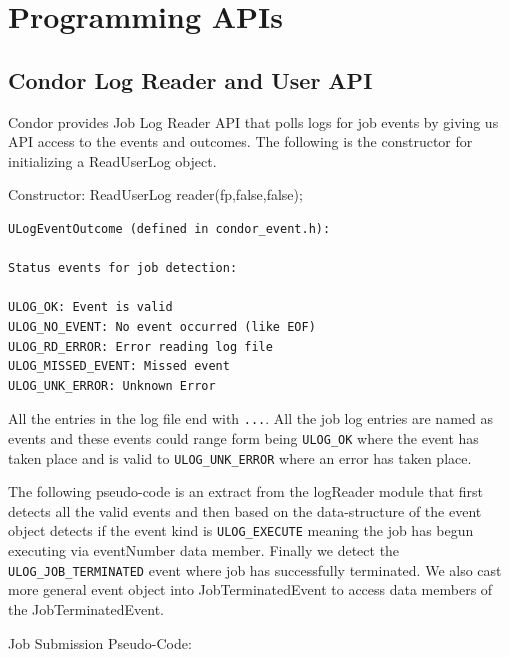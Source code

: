 \documentclass[ms,electronic,double]{nuthesis}
\begin{document}
\section{Programming APIs}
\subsection{Condor Log Reader and User API}

Condor provides Job Log Reader API\cite{manual56} that polls logs for job events by giving us 
API access to the events and outcomes. The following is the constructor for 
initializing a ReadUserLog object.

Constructor:
ReadUserLog reader(fp,false,false);
\begin{verbatim}
ULogEventOutcome (defined in condor_event.h):

Status events for job detection:

ULOG_OK: Event is valid
ULOG_NO_EVENT: No event occurred (like EOF)
ULOG_RD_ERROR: Error reading log file
ULOG_MISSED_EVENT: Missed event
ULOG_UNK_ERROR: Unknown Error
\end{verbatim}

All the entries in the log file end with \texttt{...}. All the job 
log entries are named as events and these events could range form being  \texttt{ULOG\_OK} where 
the event has taken place and is valid to \texttt{ULOG\_UNK\_ERROR} where an error has 
taken place.

The following pseudo-code is an extract from the logReader module that first 
detects all the valid events and then based on the data-structure of the event 
object detects if the event kind is \texttt{ULOG\_EXECUTE} meaning the job has begun 
executing via eventNumber data member. Finally we detect the \texttt{ULOG\_JOB\_TERMINATED} 
event where job has successfully terminated. We also cast more general event 
object into JobTerminatedEvent to access data members of the JobTerminatedEvent.


Job Submission Pseudo-Code:
\end{document}
